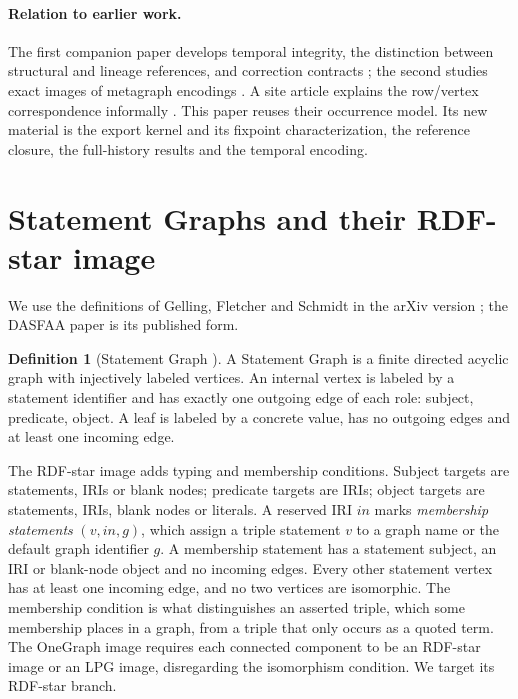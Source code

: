 \documentclass[11pt]{article}
\theoremstyle{plain}
\theoremstyle{definition}
\newtheorem{definition}{Definition}
\theoremstyle{remark}
\begin{document}
\paragraph{Relation to earlier work.}
The first companion paper develops temporal integrity, the distinction between
structural and lineage references, and correction contracts
\cite{pavlyshyn2026lbg}; the second studies exact images of metagraph encodings
\cite{pavlyshyn2026metagraphenc}. A site article explains the row/vertex
correspondence informally \cite{pavlyshyn2026statementarticle}. This paper reuses
their occurrence model. Its new material is the export kernel and its fixpoint
characterization, the reference closure, the full-history results and the temporal
encoding.

\section{Statement Graphs and their RDF-star image}\label{sec:background}
We use the definitions of Gelling, Fletcher and Schmidt in the arXiv version
\cite{gelling2023bridging}; the DASFAA paper \cite{gelling2024statement} is its
published form.

\begin{definition}[Statement Graph {\cite[Def.~4.1]{gelling2023bridging}}]
A Statement Graph is a finite directed acyclic graph with injectively labeled
vertices. An internal vertex is labeled by a statement identifier and has exactly
one outgoing edge of each role: subject, predicate, object. A leaf is labeled by a
concrete value, has no outgoing edges and at least one incoming edge.
\end{definition}

The RDF-star image \cite[Def.~5.1]{gelling2023bridging} adds typing and membership
conditions. Subject targets are statements, IRIs or blank nodes; predicate targets
are IRIs; object targets are statements, IRIs, blank nodes or literals. A reserved
IRI $\mathit{in}$ marks \emph{membership statements} $(v,\mathit{in},g)$, which
assign a triple statement $v$ to a graph name or the default graph identifier $g$.
A membership statement has a statement subject, an IRI or blank-node object and no
incoming edges. Every other statement vertex has at least one incoming edge, and no
two vertices are isomorphic. The membership condition is what distinguishes an
asserted triple, which some membership places in a graph, from a triple that only
occurs as a quoted term. The OneGraph image \cite[Def.~5.4]{gelling2023bridging}
requires each connected component to be an RDF-star image or an LPG image,
disregarding the isomorphism condition. We target its RDF-star branch.
\end{document}
